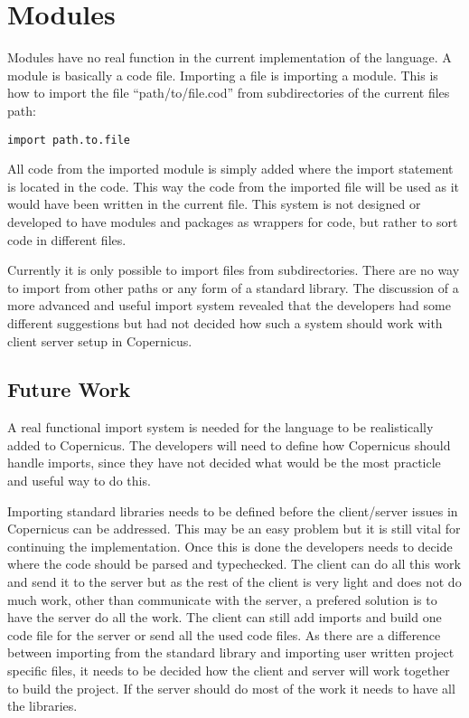 \section{Modules}
Modules have no real function in the current implementation of the
language. A module is basically a code file. Importing a file is
importing a module. This is how to import the file
``path/to/file.cod'' from subdirectories of the current files path:

\begin{verbatim}
import path.to.file
\end{verbatim}

All code from the imported module is simply added where the import
statement is located in the code. This way the code from the imported
file will be used as it would have been written in the current
file. This system is not designed or developed to have modules and
packages as wrappers for code, but rather to sort code in different
files. 

Currently it is only possible to import files from
subdirectories. There are no way to import from other paths or any
form of a standard library. The discussion of a more advanced and
useful import system revealed that the developers had some different
suggestions but had not decided how such a system should work with
client server setup in Copernicus.

\subsection{Future Work}
A real functional import system is needed for the language to be
realistically added to Copernicus. The developers will need to define
how Copernicus should handle imports, since they have not decided what
would be the most practicle and useful way to do this.

Importing standard libraries needs to be defined before the
client/server issues in Copernicus can be addressed. This may be an
easy problem but it is still vital for continuing the
implementation. Once this is done the developers needs to decide where
the code should be parsed and typechecked. The client can do all this
work and send it to the server but as the rest of the client is very
light and does not do much work, other than communicate with the
server, a prefered solution is to have the server do all the work. The
client can still add imports and build one code file for the server or
send all the used code files. As there are a difference between
importing from the standard library and importing user written project
specific files, it needs to be decided how the client and server will
work together to build the project. If the server should do most of
the work it needs to have all the libraries.

